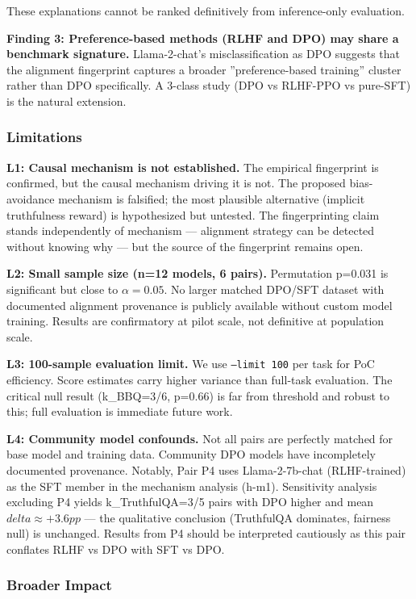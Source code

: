These explanations cannot be ranked definitively from inference-only evaluation.

\textbf{Finding 3: Preference-based methods (RLHF and DPO) may share a benchmark signature.}
Llama-2-chat's misclassification as DPO suggests that the alignment fingerprint captures
a broader ''preference-based training'' cluster rather than DPO specifically. A 3-class
study (DPO vs RLHF-PPO vs pure-SFT) is the natural extension.

\subsubsection{Limitations}

\textbf{L1: Causal mechanism is not established.} The empirical fingerprint is confirmed, but
the causal mechanism driving it is not. The proposed bias-avoidance mechanism is falsified;
the most plausible alternative (implicit truthfulness reward) is hypothesized but untested.
The fingerprinting claim stands independently of mechanism --- alignment strategy can be
detected without knowing why --- but the source of the fingerprint remains open.

\textbf{L2: Small sample size (n=12 models, 6 pairs).} Permutation p=0.031 is significant but
close to $\alpha =0.05$. No larger matched DPO/SFT dataset with documented alignment provenance
is publicly available without custom model training. Results are confirmatory at pilot
scale, not definitive at population scale.

\textbf{L3: 100-sample evaluation limit.} We use \texttt{--limit 100} per task for PoC efficiency.
Score estimates carry higher variance than full-task evaluation. The critical null result
(k\_BBQ=3/6, p=0.66) is far from threshold and robust to this; full evaluation is
immediate future work.

\textbf{L4: Community model confounds.} Not all pairs are perfectly matched for base model
and training data. Community DPO models have incompletely documented provenance.
Notably, Pair P4 uses Llama-2-7b-chat (RLHF-trained) as the SFT member in the mechanism
analysis (h-m1). Sensitivity analysis excluding P4 yields k\_TruthfulQA=3/5 pairs with
DPO higher and mean $delta\approx +3.6pp$ --- the qualitative conclusion (TruthfulQA dominates,
fairness null) is unchanged. Results from P4 should be interpreted cautiously as this
pair conflates RLHF vs DPO with SFT vs DPO.

\subsubsection{Broader Impact}

